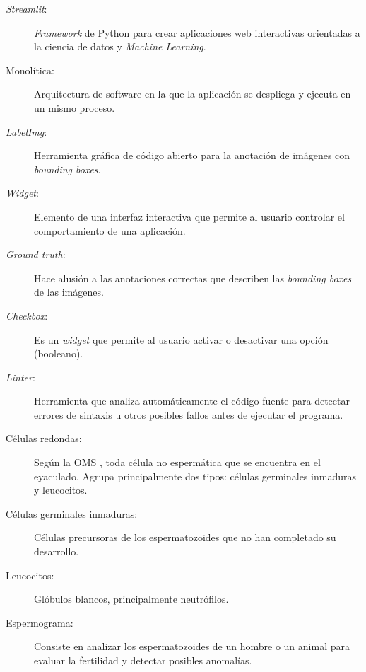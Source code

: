 \documentclass[12pt,a4paper,onecolumn,oneside]{report}
\begin{document}
\begin{description}
  \item[\textit{Streamlit}:] \textit{Framework} de Python para crear aplicaciones web interactivas orientadas a la ciencia de datos y \textit{Machine Learning}.
  \item[Monolítica:] Arquitectura de software en la que la aplicación se despliega y ejecuta en un mismo proceso.     
  \item[\textit{LabelImg}:] Herramienta gráfica de código abierto para la anotación de imágenes con \textit{bounding boxes}.
  \item[\textit{Widget}:] Elemento de una interfaz interactiva que permite al usuario controlar el comportamiento de una aplicación.
  \item[\textit{Ground truth}:] Hace alusión a las anotaciones correctas que describen las \textit{bounding boxes} de las imágenes.
  \item[\textit{Checkbox}:] Es un \textit{widget} que permite al usuario activar o desactivar una opción (booleano).  
  \item[\textit{Linter}:] Herramienta que analiza automáticamente el código fuente para detectar errores de sintaxis u otros posibles fallos antes de ejecutar el programa. 
  \item[Células redondas:] Según la OMS \cite{OMS}, toda célula no espermática que se encuentra en el eyaculado. Agrupa principalmente dos tipos: células germinales inmaduras y leucocitos.
  \item[Células germinales inmaduras:] Células precursoras de los espermatozoides que no han completado su desarrollo.
  \item[Leucocitos:] Glóbulos blancos, principalmente neutrófilos.  
  \item[Espermograma:] Consiste en analizar los espermatozoides de un hombre o un animal para evaluar la fertilidad y detectar posibles anomalías. 

\end{description}
\end{document}
